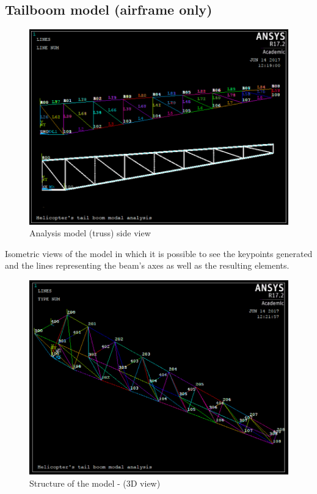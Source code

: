  \smallskip
\subsection*{Tailboom model (airframe only)}

\begin{figure}[h]
	\begin{center}
		\centering  		 		
		\includegraphics[width=1\linewidth]{PICTURES/2_Lama_truss/PNG/model_1_mod.png}
	\end{center}
	\caption {Analysis model (truss) side view}
\end{figure}
\vspace{0.5cm}



\noindent
Isometric views of the model in which it is possible to see the keypoints generated and the lines representing the beam's axes as well as the resulting elements. 
 \smallskip
\begin{figure}[h!]
	\begin{center}
		\centering  		 		
		\includegraphics[width=0.79\linewidth]{PICTURES/2_Lama_truss/PNG/model_2.png}
	\end{center}
	\caption {Structure of the model - (3D view)}
\end{figure}

